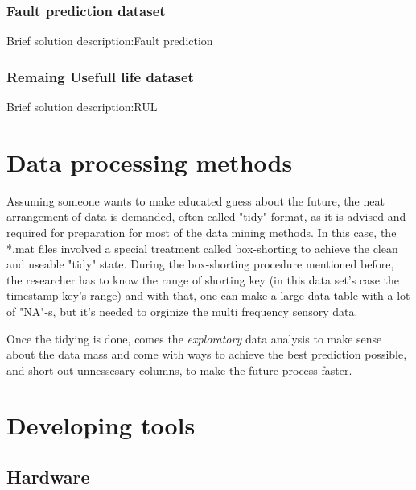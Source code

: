 			\subsubsection{Fault prediction dataset}
Brief solution description:Fault prediction
			\subsubsection{Remaing Usefull life dataset}
Brief solution description:RUL
	\section{Data processing methods}


				\noindent
Assuming someone wants to make educated guess about the future, the neat arrangement of data is demanded, often called "tidy" format, as it is advised and required for preparation for most of the data mining methods.
				\noindent
In this case, the *.mat files involved a special treatment called box-shorting to achieve the clean and useable "tidy" state. During the box-shorting procedure mentioned before, the researcher has to know the range of shorting key (in this data set's case the timestamp key's range) and with that, one can make a large data table with a lot of "NA"-s, but it's needed to orginize the multi frequency sensory data.

Once the tidying is done, comes the \textit{exploratory} data analysis to make sense about the data mass and come with ways to achieve the best prediction possible, and short out unnessesary columns, to make the future process faster.
	\section{Developing tools}
		\subsection{Hardware}
